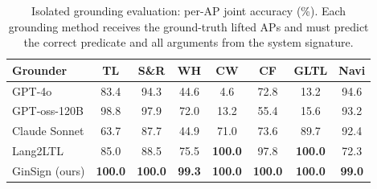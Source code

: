 \begin{table}[t]
\centering
\caption{Isolated grounding evaluation: per-AP joint accuracy (\%).
  Each grounding method receives the ground-truth lifted APs and must predict
  the correct predicate and all arguments from the system signature.}
\label{tab:grounding}
\small
\setlength{\tabcolsep}{4pt}
\begin{tabular}{l|ccccccc}
\toprule
Grounder & TL & S\&R & WH & CW & CF & GLTL & Navi \\
\midrule
GPT-4o & 83.4 & 94.3 & 44.6 & 4.6 & 72.8 & 13.2 & 94.6 \\
GPT-oss-120B & 98.8 & 97.9 & 72.0 & 13.2 & 55.4 & 15.6 & 93.2 \\
Claude Sonnet & 63.7 & 87.7 & 44.9 & 71.0 & 73.6 & 89.7 & 92.4 \\
Lang2LTL & 85.0 & 88.5 & 75.5 & \textbf{100.0} & 97.8 & \textbf{100.0} & 72.3 \\
GinSign (ours) & \textbf{100.0} & \textbf{100.0} & \textbf{99.3} & \textbf{100.0} & \textbf{100.0} & \textbf{100.0} & \textbf{99.0} \\
\bottomrule
\end{tabular}
\end{table}
